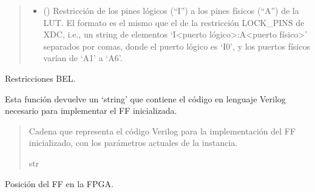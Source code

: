 \documentclass[letterpaper,10pt,english]{sphinxmanual}
\begin{document}
\begin{fulllineitems}
\begin{quote}
\begin{description}
\begin{itemize}
\item {} 
\sphinxAtStartPar
{} () \textendash{} Restricción de los pines lógicos (“I”) a los pines físicos (“A”) de la LUT. El formato es el mismo que el de la restricción LOCK\_PINS de XDC, i.e., un string de elementos ‘I\textless{}puerto lógico\textgreater{}:A\textless{}puerto físico\textgreater{}’ separados por comas, donde el puerto lógico es ‘I0’, y los puertos físicos varían de ‘A1’ a ‘A6’.

\end{itemize}

\end{description}\end{quote}

\begin{fulllineitems}
\label{\detokenize{fpga:fpga.FlipFlop.bel}}
\pysigstartsignatures
{}
\pysigstopsignatures
\sphinxAtStartPar
Restricciones BEL.

\end{fulllineitems}


\begin{fulllineitems}
\label{\detokenize{fpga:fpga.FlipFlop.impl}}
\pysigstartsignatures
{}
\pysigstopsignatures
\sphinxAtStartPar
Esta función devuelve un ‘string’ que contiene el código en lenguaje Verilog necesario para implementar el FF inicializada.
\begin{quote}\begin{description}
\sphinxAtStartPar
Cadena que representa el código Verilog para la implementación del FF inicializado, con los parámetros actuales de la instancia.

\sphinxAtStartPar
str

\end{description}\end{quote}

\end{fulllineitems}


\begin{fulllineitems}
\label{\detokenize{fpga:fpga.FlipFlop.loc}}
\pysigstartsignatures
{}
\pysigstopsignatures
\sphinxAtStartPar
Posición del FF en la FPGA.


\end{fulllineitems}
\end{fulllineitems}
\end{document}
